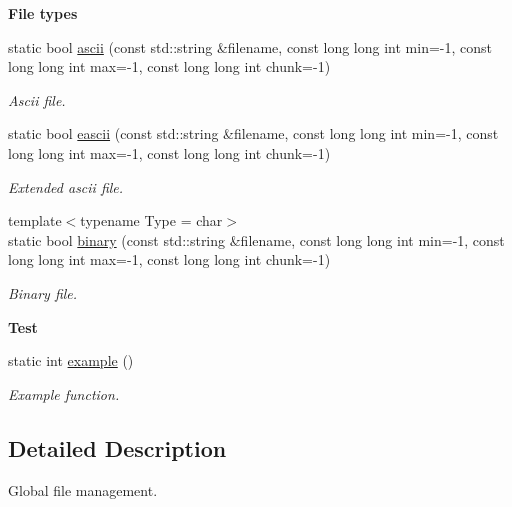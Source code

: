 \begin{Indent}{\bf File types}\par
\begin{DoxyCompactItemize}
\item 
static bool \hyperlink{exceptionmagrathea_1_1FileSystem_a1f15b71c69f7aa799b8012209e749fbd}{ascii} (const std\-::string \&filename, const long long int min=-\/1, const long long int max=-\/1, const long long int chunk=-\/1)
\begin{DoxyCompactList}\small\item\em Ascii file. \end{DoxyCompactList}\item 
static bool \hyperlink{exceptionmagrathea_1_1FileSystem_a3e62cc199cec0729e6d2516d5ba82f3c}{eascii} (const std\-::string \&filename, const long long int min=-\/1, const long long int max=-\/1, const long long int chunk=-\/1)
\begin{DoxyCompactList}\small\item\em Extended ascii file. \end{DoxyCompactList}\item 
{\footnotesize template$<$typename Type  = char$>$ }\\static bool \hyperlink{exceptionmagrathea_1_1FileSystem_aa99f1baaaac4e91b2bfdb38798e20263}{binary} (const std\-::string \&filename, const long long int min=-\/1, const long long int max=-\/1, const long long int chunk=-\/1)
\begin{DoxyCompactList}\small\item\em Binary file. \end{DoxyCompactList}\end{DoxyCompactItemize}
\end{Indent}
\begin{Indent}{\bf Test}\par
\begin{DoxyCompactItemize}
\item 
static int \hyperlink{exceptionmagrathea_1_1FileSystem_a36d84f3342bac68ef5b4c92bc3965041}{example} ()
\begin{DoxyCompactList}\small\item\em Example function. \end{DoxyCompactList}\end{DoxyCompactItemize}
\end{Indent}


\subsection{Detailed Description}
Global file management. 

